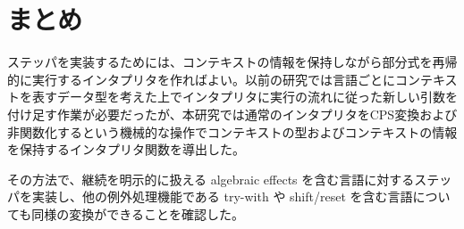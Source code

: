 \section{まとめ}
\label{section:conclusion}

ステッパを実装するためには、コンテキストの情報を保持しながら部分式を再帰的に実行するインタプリタを作ればよい。以前の研究\cite{FCA19}では言語ごとにコンテキストを表すデータ型を考えた上でインタプリタに実行の流れに従った新しい引数を付け足す作業が必要だったが、本研究では通常のインタプリタをCPS変換および非関数化するという機械的な操作でコンテキストの型およびコンテキストの情報を保持するインタプリタ関数を導出した。

その方法で、継続を明示的に扱える algebraic effects を含む言語に対するステッパを実装し、他の例外処理機能である try-with や shift/reset を含む言語についても同様の変換ができることを確認した。
